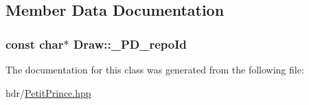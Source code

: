\subsection{Member Data Documentation}
\subsubsection[{\texorpdfstring{\+\_\+\+P\+D\+\_\+repo\+Id}{_PD_repoId}}]{ const char$\ast$ Draw\+::\+\_\+\+P\+D\+\_\+repo\+Id\hspace{0.3cm}{\ttfamily [static]}}\hypertarget{class_draw_aa81c5a904a215524ca32f588126783bc}{}\label{class_draw_aa81c5a904a215524ca32f588126783bc}


The documentation for this class was generated from the following file\+:\begin{DoxyCompactItemize}
\item 
hdr/\hyperlink{_petit_prince_8hpp}{Petit\+Prince.\+hpp}\end{DoxyCompactItemize}
